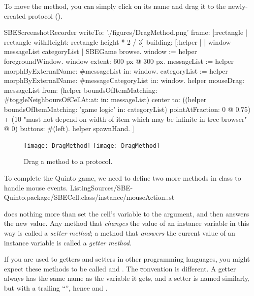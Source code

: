 \documentclass[a4paper,10pt,twoside]{book}
\begin{document}
To move the method, you can simply click on its name and drag it to the newly-created protocol ().

\begin{ExecuteSmalltalkScript}
SBEScreenshotRecorder writeTo: './figures/DragMethod.png' frame: [:rectangle | rectangle withHeight: rectangle height * 2 / 3] building: [:helper |
	| window messageList categoryList |
	SBEGame browse.
	window := helper foregroundWindow.
	window extent: 600 px @ 300 px.
	messageList := helper morphByExternalName: #messageList in: window.
	categoryList := helper morphByExternalName: #messageCategoryList in: window.
	helper
		mouseDrag: messageList
		from: (helper boundsOfItemMatching: #toggleNeighboursOfCellAt:at: in: messageList) center
		to: ((helper boundsOfItemMatching: 'game logic' in: categoryList) pointAtFraction: 0 @ 0.75) + (10 "must not depend on width of item which may be infinite in tree browser" @ 0)
		buttons: #(left).
	helper spawnHand.
]
\end{ExecuteSmalltalkScript}
\begin{figure}[htbp]
   \centering
   \ifluluelse
		{\texttt{[image: DragMethod]} }
		{\texttt{[image: DragMethod]} }
	\caption{Drag a method to a protocol.\label{fig:dragMethod}}
\end{figure}

To complete the Quinto game, we need to define two more methods in class  to handle mouse events.
%
{ListingSources/SBE-Quinto.package/SBECell.class/instance/mouseAction..st}

 does nothing more than set the cell's  variable to the argument, and then answers the new value.
Any method that \emph{changes} the value of an instance variable in this way is called a \emph{setter method}; a method that \emph{answers} the current value of an instance variable is called a \emph{getter method}.

If you are used to getters and setters in other programming languages, you might expect these methods to be called  and .
The \st convention is different.
A getter always has the same name as the variable it gets, and a setter is named similarly, but with a trailing ``\ct{:}'', hence  and .
\end{document}
